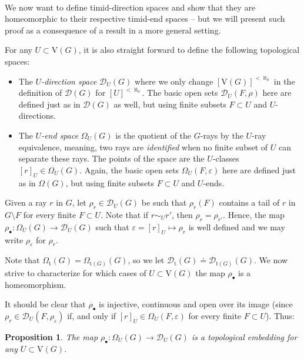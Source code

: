 \documentclass[10pt]{article}
\numberwithin{equation}{subsection}
\newtheorem{proposition}[equation]{Proposition}
\theoremstyle{remark}
\begin{document}
\paragraph{} We now want to define timid-direction spaces and show that they are homeomorphic to their respective timid-end spaces -- but we will present such proof as a consequence of a result in a more general setting. 

For any $U \subset \mathrm{V}(G)$, it is also straight forward to define the following topological spaces:
\begin{itemize}
    \item[(i)] The \emph{$U$-direction space} $\mathcal{D}_U(G)$ where we only change $[\mathrm{V}(G)]^{< \aleph_0}$ in the definition of $\mathcal{D}(G)$ for $[U]^{< \aleph_0}$. The basic open sets $\mathcal{D}_U(F,\rho)$ here are defined just as in $\mathcal{D}(G)$ as well, but using finite subsets $F\subset U$ and $U$-directions.
    \item[(ii)] The \emph{$U$-end space} $\Omega_U(G)$ is the quotient of the $G$-rays by the $U$-ray equivalence, meaning, two rays are \emph{identified} when no finite subset of $U$ can separate these rays. The points of the space are the $U$-classes $[r]_U \in \Omega_U(G)$. Again, the basic open sets $\Omega_U(F,\varepsilon)$ here are defined just as in $\Omega(G)$, but using finite subsets $F\subset U$ and $U$-ends.
\end{itemize}

Given a ray $r$ in $G$, let $\rho_r\in \mathcal{D}_U(G)$ be such that $\rho_r(F)$ contains a tail of $r$ in $G\setminus F$ for every finite $F\subset U$. Note that if $r\sim_U r'$, then $\rho_r = \rho_{r'}$. Hence, the map $\rho_\bullet\colon \Omega_U(G)\to \mathcal{D}_U(G)$ such that $\varepsilon = [r]_U \mapsto \rho_r$ is well defined and we may write $\rho_\varepsilon$ for $\rho_r$.

Note that $\Omega_{\mathrm{t}}(G)= \Omega_{\mathrm{t}(G)}(G)$, so we let $\mathcal{D}_{\mathrm{t}}(G)\doteq \mathcal{D}_{\mathrm{t}(G)}(G)$. We now strive to characterize for which cases of $U\subset \mathrm{V}(G)$ the map $\rho_\bullet$ is a homeomorphism.

It should be clear that $\rho_\bullet$ is injective, continuous and open over its image (since $\rho_r\in \mathcal{D}_U(F,\rho_\varepsilon)$ if, and only if $[r]_U\in \Omega_U(F,\varepsilon)$ for every finite $F\subset U$). Thus:

 \begin{proposition}\label{PROP_UTopEmbed}
       The map $\rho_\bullet\colon \Omega_U(G)\to \mathcal{D}_U(G)$ is a topological embedding for any $U\subset \mathrm{V}(G)$.
 \end{proposition}
\end{document}
